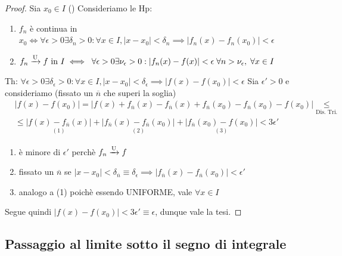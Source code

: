 \begin{proof}
    Sia \(x_{0}\in I\) ()
    Consideriamo le Hp:
    \begin{enumerate}
        \item \(f_{n}\) è continua in \(x_{0} \iff \forall \epsilon > 0 \exists \delta_{n}>0 : \forall x \in I, |x-x_{0}| < \delta_{n} \implies |f_{n}(x)-f_{n}(x_{0})|<\epsilon\)
        \item \(f_{n}\conv{U}f \text{ in } I \iff \forall \epsilon > 0 \exists \nu_{\epsilon}>0: |f_{n}(x)-f(x)|<\epsilon \forall n>\nu_{\epsilon}, \forall x \in I\)
    \end{enumerate}
    Th: \(\forall \epsilon>0 \exists \delta_{\epsilon}>0 : \forall x \in I, |x-x_{0}|<\delta_{\epsilon}\implies |f(x)-f(x_{0})|<\epsilon\)
    Sia \(\epsilon'>0\) e consideriamo (fissato un \(\overline{n}\) che superi la soglia)
    \begin{align*}
    &|f(x)-f(x_{0})|=|f(x)+f_{\overline{n}}(x)-f_{\overline{n}}(x)+f_{\overline{n}}(x_{0})-f_{\overline{n}}(x_{0})-f(x_{0})| \underset{\text{Dis. Tri.}}{\leq} \\ 
    &\leq \underset{(1)}{|f(x)-f_{\overline{n}}(x)|}+\underset{(2)}{|f_{\overline{n}}(x)-f_{\overline{n}}(x_{0})|}+\underset{(3)}{|f_{\overline{n}}(x_{0})-f(x_{0})|} < 3\epsilon'
    \end{align*}
\begin{oss}
\begin{enumerate}
    \item è minore di \(\epsilon'\) perchè \(f_{n}\xrightarrow{\mathrm{U}}f\)
    \item fissato un \(\overline{n}\) se \(|x-x_{0}|<\delta_{\overline{n}}\equiv \delta_{\epsilon}\implies |f_{\overline{n}}(x)-f_{\overline{n}}(x_{0})|<\epsilon'\)
    \item analogo a (1) poichè essendo UNIFORME, vale \(\forall x \in I\)
\end{enumerate}
\end{oss}
Segue quindi \(|f(x)-f(x_{0})|<3\epsilon' \equiv \epsilon\), dunque vale la tesi.
\end{proof}


\subsection{Passaggio al limite sotto il segno di integrale}

